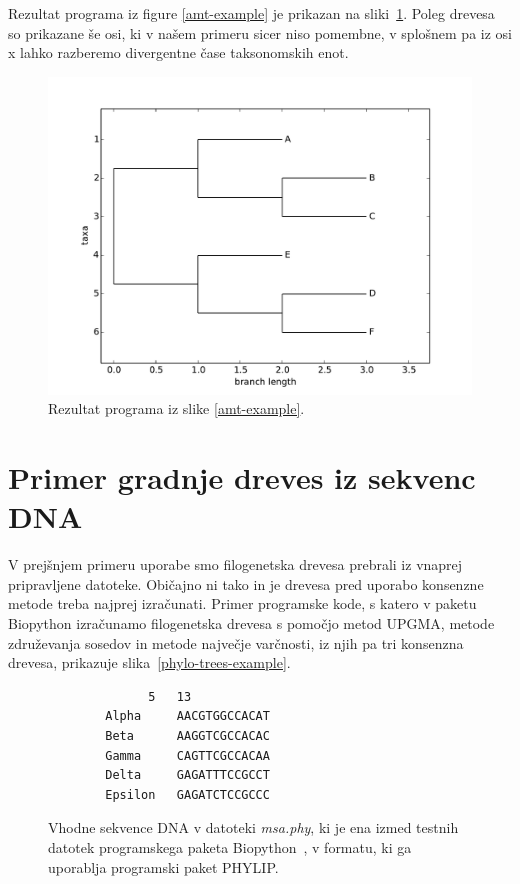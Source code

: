 \documentclass[a4paper, 12pt]{book}
\begin{document}
Rezultat programa iz figure \ref{amt-example} je prikazan na 
sliki~\ref{img-example-output}. Poleg drevesa so prikazane še osi, 
ki v našem primeru sicer niso pomembne, v splošnem pa iz osi x lahko 
razberemo divergentne čase taksonomskih enot. 
\\
\begin{figure}[h!]
	\begin{center}
		\includegraphics[scale=0.6, clip=true, trim=1cm 0 1cm 1cm]{gfx/ex_b.pdf}
	\end{center}
	\caption{Rezultat programa iz slike \ref{amt-example}.}
	\label{img-example-output}
\end{figure}

\section{Primer gradnje dreves iz sekvenc DNA}

V prejšnjem primeru uporabe smo filogenetska drevesa prebrali iz vnaprej pripravljene
datoteke. Običajno ni tako in je drevesa pred uporabo konsenzne
metode treba najprej izračunati. Primer programske kode, s katero v paketu
Biopython izračunamo filogenetska drevesa s pomočjo metod UPGMA, metode združevanja 
sosedov in metode največje varčnosti, iz njih pa tri konsenzna drevesa, 
prikazuje slika~\ref{phylo-trees-example}.

\begin{figure}
\begin{lstlisting}
              5   13
        Alpha     AACGTGGCCACAT
        Beta      AAGGTCGCCACAC
        Gamma     CAGTTCGCCACAA
        Delta     GAGATTTCCGCCT
        Epsilon   GAGATCTCCGCCC
\end{lstlisting}
\caption{
Vhodne sekvence DNA v datoteki {\it msa.phy}, ki je ena izmed testnih datotek
programskega paketa Biopython~\cite{bio-phylo}, v formatu, ki ga uporablja 
programski paket PHYLIP.
}
\end{figure}
\end{document}
